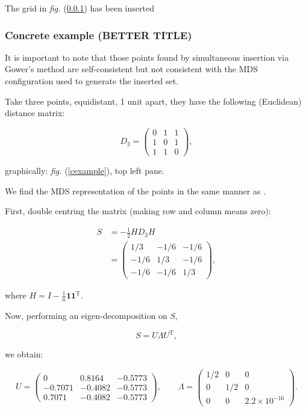 \documentclass[a4paper,10pt]{amsart}
\newcommand{\fig}[1]{\emph{fig.} (\ref{#1})}
\newcommand{\cross}{\times}
\begin{document}
The grid in \fig{} has been inserted 


\subsubsection{Concrete example (BETTER TITLE)}

It is important to note that those points found by simultaneous insertion via Gower's method are self-consistent but not consistent with the MDS configuration used to generate the inserted set.

Take three points, equidistant, 1 unit apart, they have the following (Euclidean) distance matrix:

\begin{equation*}
D_3 = \begin{pmatrix} 0 & 1& 1\\1 & 0 & 1\\ 1 & 1 & 0\end{pmatrix},
\end{equation*}

graphically: \fig{cexample}, top left pane.

We find the MDS representation of the points in the same manner as \cite{diaconis08}.

First, double centring the matrix (making row and column means zero):

\begin{equation*}
\begin{aligned}
S &= -\frac{1}{2} HD_3H\\
    &= \begin{pmatrix} 1/3 & -1/6 & -1/6\\-1/6 & 1/3 & -1/6\\ -1/6 & -1/6 & 1/3\end{pmatrix},
\end{aligned}
\end{equation*}

where $H=I-\frac{1}{n}\mathbf{1}\mathbf{1}^\text{T}$.

Now, performing an eigen-decomposition on $S$,

\begin{equation*}
S = U \Lambda U^\text{T},
\end{equation*}

we obtain:

\begin{equation*}
U = \begin{pmatrix} 
	0 & 0.8164 & -0.5773\\
	-0.7071 & -0.4082 & -0.5773\\ 
	0.7071 & -0.4082 & -0.5773
	\end{pmatrix},\qquad
\Lambda = \begin{pmatrix} 
	1/2 & 0 & 0\\
	0 & 1/2 & 0\\ 
	0 & 0 & 2.2\cross10^{-16}
\end{pmatrix}.
\end{equation*}
\end{document}
